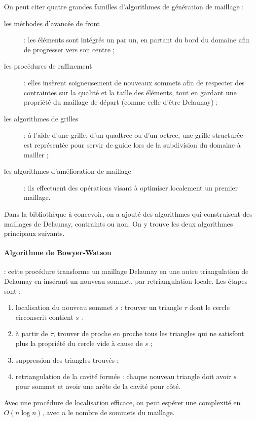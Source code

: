 \documentclass[12pt,a4paper]{report}
\begin{document}
On peut citer quatre grandes familles d'algorithmes de génération de maillage :
\begin{description}
\item[les méthodes d'avancée de front] : les éléments sont intégrés un par un, en partant du bord du domaine afin de progresser vers son centre ;
\item[les procédures de raffinement] : elles insèrent soigneusement de nouveaux sommets afin de respecter des contraintes sur la qualité et la taille des éléments, tout en gardant une propriété du maillage de départ (comme celle d'être Delaunay)  ;
\item[les algorithmes de grilles] : à l'aide d'une grille, d'un quadtree ou d'un octree, une grille structurée est représentée pour servir de guide lors de la subdivision du domaine à mailler ;
\item[les algorithmes d'amélioration de maillage] : ils effectuent des opérations visant à optimiser localement un premier maillage.
\end{description}



Dans la bibliothèque à concevoir, on a ajouté des algorithmes qui construisent des maillages de Delaunay, contraints ou non. On y trouve les deux algorithmes principaux suivants.

\paragraph{\indent Algorithme de Bowyer-Watson}\label{Bowyer-Watson} : cette procédure transforme un maillage Delaunay en une autre triangulation de Delaunay en insérant un nouveau sommet, par retriangulation locale. Les étapes sont :
\begin{enumerate}
\item localisation du nouveau sommet $s$ : trouver un triangle $\tau$ dont le cercle circonscrit contient $s$ ;
\item à partir de $\tau$, trouver de proche en proche tous les triangles qui ne satisfont plus la propriété du cercle vide à cause de $s$ ;
\item suppression des triangles trouvés ;
\item retriangulation de la cavité formée : chaque nouveau triangle doit avoir $s$ pour sommet et avoir une arête de la cavité pour côté.
\end{enumerate}
Avec une procédure de localisation efficace, on peut espérer une complexité en $O(n\log n)$, avec $n$ le nombre de sommets du maillage.
\end{document}
